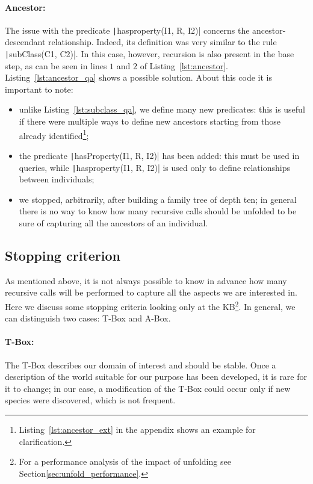 \paragraph{Ancestor:} The issue with the predicate \texttt|hasproperty(I1, R, I2)| concerns the ancestor-descendant relationship. Indeed, its definition was very similar to the rule \texttt|subClass(C1, C2)|. In this case, however, recursion is also present in the base step, as can be seen in lines $1$ and $2$ of Listing~\ref{lst:ancestor}. Listing~\ref{lst:ancestor_qa} shows a possible solution. About this code it is important to note:
\begin{itemize}
	\item unlike Listing~\ref{lst:subclass_qa}, we define many new predicates: this is useful if there were multiple ways to define new ancestors starting from those already identified\footnote{Listing~\ref{lst:ancestor_ext} in the appendix shows an example for clarification.};
	\item the predicate \texttt|hasProperty(I1, R, I2)| has been added: this must be used in queries, while \texttt|hasproperty(I1, R, I2)| is used only to define relationships between individuals;
	\item we stopped, arbitrarily, after building a family tree of depth ten; in general there is no way to know how many recursive calls should be unfolded to be sure of capturing all the ancestors of an individual.
\end{itemize}

\begin{listingenv}[h]
	\caption{Ancestor unfolding}
	\label{lst:ancestor_qa}
\end{listingenv}

\subsection{Stopping criterion}
As mentioned above, it is not always possible to know in advance how many recursive calls will be performed to capture all the aspects we are interested in. Here we discuss some stopping criteria looking only at the KB\footnote{For a performance analysis of the impact of unfolding see Section\ref{sec:unfold_performance}.}. In general, we can distinguish two cases: T-Box and A-Box.

\paragraph{T-Box:} The T-Box describes our domain of interest and should be stable. Once a description of the world suitable for our purpose has been developed, it is rare for it to change; in our case, a modification of the T-Box could occur only if new species were discovered, which is not frequent.

